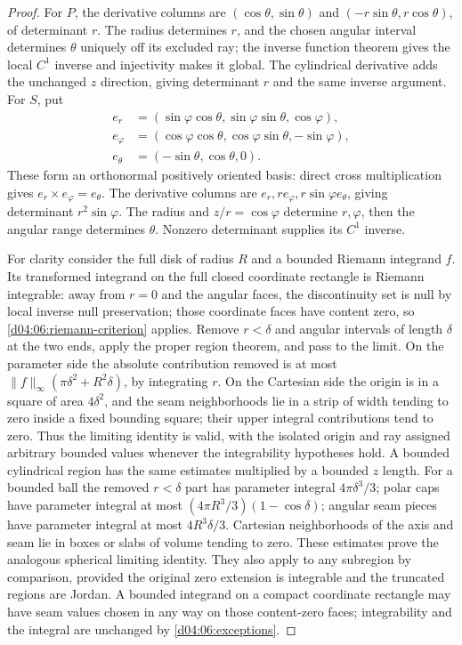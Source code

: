 \documentclass[11pt,oneside,openany]{book}
\theoremstyle{definition}
\theoremstyle{remark}
\newcommand{\norm}[1]{\lVert#1\rVert}
\begin{document}
\begin{proof}
For $P$, the derivative columns are $(\cos\theta,\sin\theta)$ and $(-r\sin\theta,r\cos\theta)$, of determinant $r$. The radius determines $r$, and the chosen angular interval determines $\theta$ uniquely off its excluded ray; the inverse function theorem gives the local $C^1$ inverse and injectivity makes it global. The cylindrical derivative adds the unchanged $z$ direction, giving determinant $r$ and the same inverse argument. For $S$, put
\begin{align*}
 e_r&=(\sin\varphi\cos\theta,\sin\varphi\sin\theta,\cos\varphi),\\
 e_\varphi&=(\cos\varphi\cos\theta,\cos\varphi\sin\theta,-\sin\varphi),\\
 e_\theta&=(-\sin\theta,\cos\theta,0).
\end{align*}
These form an orthonormal positively oriented basis: direct cross multiplication gives $e_r\times e_\varphi=e_\theta$. The derivative columns are $e_r,re_\varphi,r\sin\varphi e_\theta$, giving determinant $r^2\sin\varphi$. The radius and $z/r=\cos\varphi$ determine $r,\varphi$, then the angular range determines $\theta$. Nonzero determinant supplies its $C^1$ inverse.

For clarity consider the full disk of radius $R$ and a bounded Riemann integrand $f$. Its transformed integrand on the full closed coordinate rectangle is Riemann integrable: away from $r=0$ and the angular faces, the discontinuity set is null by local inverse null preservation; those coordinate faces have content zero, so \cref{d04:06:riemann-criterion} applies. Remove $r<\delta$ and angular intervals of length $\delta$ at the two ends, apply the proper region theorem, and pass to the limit. On the parameter side the absolute contribution removed is at most
$\norm f_\infty(\pi\delta^2+R^2\delta)$, by integrating $r$. On the Cartesian side the origin is in a square of area $4\delta^2$, and the seam neighborhoods lie in a strip of width tending to zero inside a fixed bounding square; their upper integral contributions tend to zero. Thus the limiting identity is valid, with the isolated origin and ray assigned arbitrary bounded values whenever the integrability hypotheses hold. A bounded cylindrical region has the same estimates multiplied by a bounded $z$ length. For a bounded ball the removed $r<\delta$ part has parameter integral $4\pi\delta^3/3$; polar caps have parameter integral at most $(4\pi R^3/3)(1-\cos\delta)$; angular seam pieces have parameter integral at most $4R^3\delta/3$. Cartesian neighborhoods of the axis and seam lie in boxes or slabs of volume tending to zero. These estimates prove the analogous spherical limiting identity. They also apply to any subregion by comparison, provided the original zero extension is integrable and the truncated regions are Jordan. A bounded integrand on a compact coordinate rectangle may have seam values chosen in any way on those content-zero faces; integrability and the integral are unchanged by \cref{d04:06:exceptions}.
\end{proof}
\end{document}
